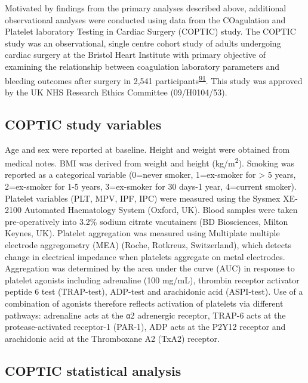 \documentclass[11pt,twoside]{bristolthesis}
\begin{document}
Motivated by findings from the primary analyses described above, additional observational analyses were conducted using data from the COagulation and Platelet laboratory Testing in Cardiac Surgery (COPTIC) study. The COPTIC study was an observational, single centre cohort study of adults undergoing cardiac surgery at the Bristol Heart Institute with primary objective of examining the relationship between coagulation laboratory parameters and bleeding outcomes after surgery in 2,541 participants\textsuperscript{\protect\hyperlink{ref-Mumford2017}{91}}. This study was approved by the UK NHS Research Ethics Committee (09/H0104/53).

\hypertarget{coptic-study-variables}{%
\subsection{COPTIC study variables}\label{coptic-study-variables}}

Age and sex were reported at baseline. Height and weight were obtained from medical notes. BMI was derived from weight and height (kg/m\textsuperscript{2}). Smoking was reported as a categorical variable (0=never smoker, 1=ex-smoker for \textgreater{} 5 years, 2=ex-smoker for 1-5 years, 3=ex-smoker for 30 days-1 year, 4=current smoker). Platelet variables (PLT, MPV, IPF, IPC) were measured using the Sysmex XE-2100 Automated Haematology System (Oxford, UK). Blood samples were taken pre-operatively into 3.2\% sodium citrate vacutainers (BD Biosciences, Milton Keynes, UK). Platelet aggregation was measured using Multiplate multiple electrode aggregometry (MEA) (Roche, Rotkreuz, Switzerland), which detects change in electrical impedance when platelets aggregate on metal electrodes. Aggregation was determined by the area under the curve (AUC) in response to platelet agonists including adrenaline (100 mg/mL), thrombin receptor activator peptide 6 test (TRAP-test), ADP-test and arachidonic acid (ASPI-test). Use of a combination of agonists therefore reflects activation of platelets via different pathways: adrenaline acts at the α2 adrenergic receptor, TRAP-6 acts at the protease-activated receptor-1 (PAR-1), ADP acts at the P2Y12 receptor and arachidonic acid at the Thromboxane A2 (TxA2) receptor.

\hypertarget{coptic-statistical-analysis}{%
\subsection{COPTIC statistical analysis}\label{coptic-statistical-analysis}}
\end{document}
